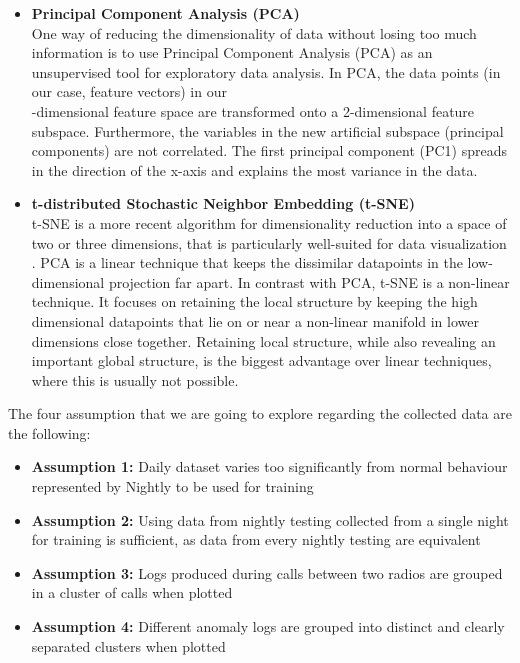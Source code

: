 \begin{itemize}
    \item \textbf{Principal Component Analysis (PCA)} \\
    One way of reducing the dimensionality of data without losing too much information is to use Principal Component Analysis (PCA) as an unsupervised tool for exploratory data analysis. 
    In PCA, the data points (in our case, feature vectors) in our\\ \featureVectorLength-dimensional feature space are transformed onto a 2-dimensional feature subspace. Furthermore, the variables in the new artificial subspace (principal components) are not correlated. The first principal component (PC1) spreads in the direction of the x-axis and explains the most variance in the data.
    
    \item \textbf{t-distributed Stochastic Neighbor Embedding (t-SNE)}\\
    t-SNE is a more recent algorithm for dimensionality reduction into a space of two or three dimensions, that is particularly well-suited for data visualization \cite{tsne}. PCA is a linear technique that keeps the dissimilar datapoints in the low-dimensional projection far apart. In contrast with PCA, t-SNE is a non-linear technique. It focuses on retaining the local structure by keeping the high dimensional datapoints that lie on or near a non-linear manifold in lower dimensions close together. Retaining local structure, while also revealing an important global structure, is the biggest advantage over linear techniques, where this is usually not possible.
    
\end{itemize}

The four assumption that we are going to explore regarding the collected data are the following: 

\begin{itemize}
    \item \textbf{Assumption 1:} Daily dataset varies too significantly from normal behaviour represented by Nightly to be used for training
    \item \textbf{Assumption 2:} Using data from nightly testing collected from a single night for training is sufficient, as data from every nightly testing are equivalent
    \item \textbf{Assumption 3:} Logs produced during calls between two radios are grouped in a cluster of calls when plotted
    \item \textbf{Assumption 4:} Different anomaly logs are grouped into distinct and clearly separated clusters when plotted
\end{itemize}

